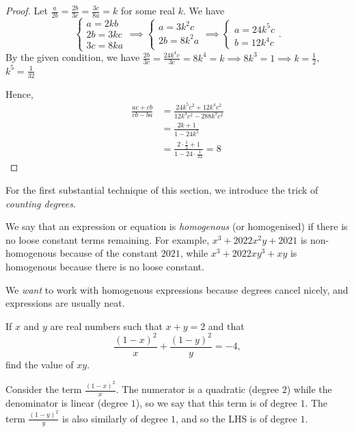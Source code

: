 \documentclass[../main.tex]{subfiles}
\begin{document}
\begin{proof}
    Let $\frac{a}{2b}=\frac{2b}{3c}=\frac{3c}{8a}=k$ for some real $k$. We have
$$ 
\begin{cases}
    a=2kb \\
    2b=3kc \\
    3c=8ka
\end{cases}
\implies
\begin{cases}
    a=3k^2c \\
    2b=8k^2a \\
\end{cases}
\implies
\begin{cases}
    a=24k^5c \\
    b=12k^4c    
\end{cases} 
.$$
By the given condition, we have $\frac{2b}{3c}=\frac{24k^4c}{3c}=8k^4=k \implies 8k^3=1 \implies k=\frac{1}{2}$, $k^5=\frac{1}{32}$

Hence,
\begin{align*}
    \frac{ac+cb}{cb-ba}
    &= \frac{24k^5c^2+12k^4c^2}{12k^4c^2-288k^9c^2} \\
    &= \frac{2k+1}{1-24k^5} \\
    &= \frac{2\cdot\frac{1}{2}+1}{1-24\cdot\frac{1}{32}} = \boxed{8}
\end{align*}
\end{proof}

For the first substantial technique of this section, we introduce the trick of \textit{counting degrees}.

\begin{proposition}
    We say that an expression or equation is \textit{homogenous} (or homogenised) if there is no loose constant terms remaining. For example, $x^3+2022x^2y+2021$ is non-homogenous because of the constant $2021$, while $x^3+2022xy^3+xy$ is homogenous because there is no loose constant. 

    We \textit{want} to work with homogenous expressions because degrees cancel nicely, and expressions are usually neat. 
\end{proposition}
\begin{example}
    If $x$ and $y$ are real numbers such that $x+y=2$ and that
    $$\frac{(1-x)^2}{x}+\frac{(1-y)^2}{y}=-4,$$
    find the value of $xy$.
\end{example}

Consider the term $\frac{(1-x)^2}{x}$. The numerator is a quadratic (degree $2$) while the denominator is linear (degree $1$), so we say that this term is of degree $1$. The term $\frac{(1-y)^2}{y}$ is also similarly of degree $1$, and so the LHS is of degree $1$. 
\end{document}
